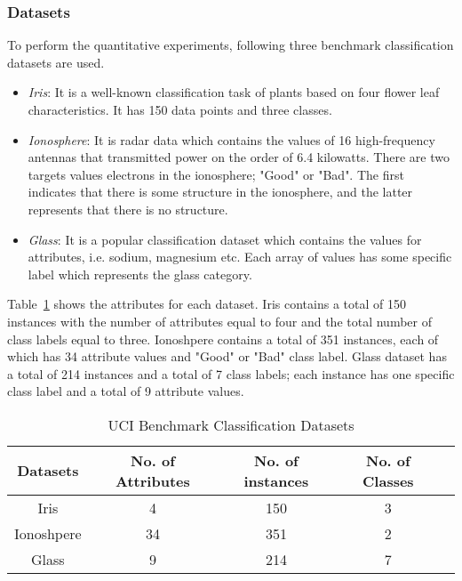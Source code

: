 \documentclass[english]{tktltiki2}
\theoremstyle{definition}
\theoremstyle{remark}
\begin{document}
\subsubsection{Datasets}\label{sec:datasets_UCI}
To perform the quantitative experiments, following three benchmark classification datasets are used.
\begin{center}
	\begin{itemize}
		\item \textit{Iris}: It is a well-known classification task of plants based on four flower leaf characteristics. It has 150 data points and three classes.
		\item \textit{Ionosphere}: It is radar data which contains the values of 16 high-frequency antennas that transmitted power on the order of 6.4 kilowatts. There are two targets values electrons in the ionosphere; "Good" or "Bad". The first indicates that there is some structure in the ionosphere, and the latter represents that there is no structure.
		\item \textit{Glass}: It is a popular classification dataset which contains the values for attributes, i.e. sodium, magnesium etc. 
		Each array of values has some specific label which represents the glass category.
	\end{itemize}
\end{center}

Table~\ref{table:datasets_UCI} shows the attributes for each dataset. Iris contains a total of 150 instances with the number of attributes equal to four and the total number of class labels equal to three. Ionoshpere contains a total of 351 instances, each of which has 34 attribute values and "Good" or "Bad" class label. Glass dataset has a total of 214 instances and a total of 7 class labels; each instance has one specific class label and a total of 9 attribute values.

\begin{table}[H]
	\caption{UCI Benchmark Classification Datasets}
	\label{table:datasets_UCI}
	\begin{center}
	\begin{tabular}{|c|c|c|c|c|}
		\hline	
		\textbf{Datasets} & \textbf{No. of Attributes} & \textbf{No. of instances} & \textbf{No. of Classes} \\ \hline
		
		Iris  & 4 & 150 & 3 \\ \hline
		Ionoshpere  & 34 & 351 & 2 \\ \hline
		Glass  & 9 & 214 & 7 \\ \hline
	\end{tabular}
	\end{center}
\end{table}
\end{document}
